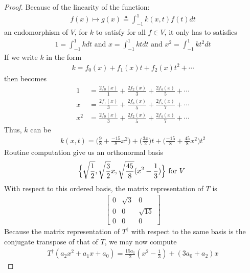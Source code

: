 \documentclass{report}
\begin{document}
\begin{proof}
Because of the linearity of the function:
\begin{align*}
f(x) \mapsto g(x)\triangleq \int_{-1}^1 k(x,t)f(t)dt
\end{align*}
an endomorphism of $V$, for $k$ to satisfy  for all $f\in V$, it only has to satisfies 
\begin{align}
\label{solve}
1=\int_{-1}^{1}kdt\text{ and }x=\int_{-1}^{1}ktdt \text{ and }x^2 =\int_{-1}^{1}kt^2dt
\end{align}
If we write $k$ in the form 
\begin{align*}
k= f_0(x)+ f_1(x)t+ f_2(x)t^2 + \cdots 
\end{align*}
then  becomes 
\begin{align*}
1&= \frac{2f_0(x)}{1}+ \frac{2f_2(x)}{3}+ \frac{2f_4(x)}{5}+ \cdots  \\
x&=  \frac{2f_1(x)}{3}+ \frac{2f_3(x)}{5}+ \frac{2f_5(x)}{7}+ \cdots \\
x^2&= \frac{2f_0(x)}{3} + \frac{2f_2(x)}{5}+ \frac{2f_4(x)}{7}+ \cdots 
\end{align*}
Thus, $k$ can be 
\begin{align*}
k(x,t)= \Big(\frac{9}{8}+ \frac{-15}{8}x^2\Big)+ \Big(\frac{3x}{2}\Big)t+ \Big(\frac{-15}{8}+ \frac{45}{8}x^2\Big)t^2 
\end{align*}
Routine computation give us an orthonormal basis 
\begin{align*}
\Big\{ \sqrt{\frac{1}{2}}, \sqrt{\frac{3}{2}}x, \sqrt{\frac{45}{8}}(x^2- \frac{1}{3}) \Big\}\text{ for $V$ }
\end{align*}
With respect to this ordered basis, the matrix representation of $T$ is 
\begin{align*}
\begin{bmatrix}
  0 & \sqrt{3}  & 0 \\
  0 & 0 & \sqrt{15} \\
  0 & 0 & 0 
\end{bmatrix}
\end{align*}
Because the matrix representation of $T^\dagger $ with respect to the same basis is the conjugate transpose of that of  $T$, we may now compute 
 \begin{align*}
T^\dagger (a_2x^2+a_1x+a_0)= \frac{15a_1}{2}(x^2- \frac{1}{3})+ (3a_0+a_2)x
\end{align*}
\end{proof}
\end{document}

